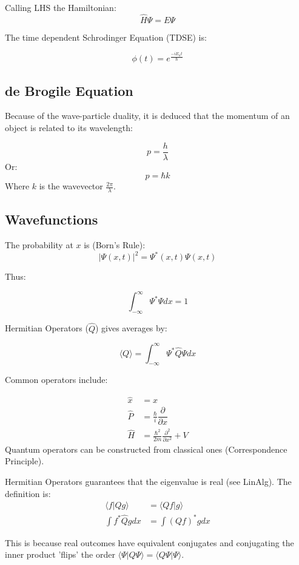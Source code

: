 \documentclass[12pt]{article}
\begin{document}
Calling LHS the Hamiltonian:
\[ \hat{H}\Psi = E\Psi\]

The time dependent Schrodinger Equation (TDSE) is:

\[\phi (t) = e^{\frac{-iE_n t}{\hbar}}\]

\subsection{de Brogile Equation}

Because of the wave-particle duality, it is deduced that the momentum of an object is related to its wavelength:

\[ p = \frac{h}{\lambda}\]
Or: 
\[ p = \hbar k\]
Where $k$ is the wavevector $\frac{2\pi}{\lambda}$.

\subsection{Wavefunctions}

The probability at $x$ is (Born's Rule):
\[|\Psi(x,t)|^2  = \Psi^*(x,t)\Psi(x,t)\]

Thus:

\[ \int_{-\infty}^{\infty}\Psi^*\Psi dx = 1\]

Hermitian Operators ($\hat{Q}$) gives averages by:

\[ \langle Q \rangle = \int_{-\infty}^{\infty}\Psi^* \hat{Q}\Psi dx\]

Common operators include:

\begin{align*}
    \hat{x} &= x \\
    \hat{P} &= \frac{\hbar}{i} \dfrac{\partial}{\partial x}\\
    \hat{H} &= \frac{\hbar^2}{2m}\frac{\partial^2}{\partial x^2} + V
\end{align*}
Quantum operators can be constructed from classical ones (Correspondence Principle).

Hermitian Operators guarantees that the eigenvalue is real (see LinAlg). The definition is:
\begin{align*}
    \langle f|Qg \rangle &= \langle Qf | g \rangle\\
    \int f^* \hat{Q}g dx &= \int (Qf)^* g dx
\end{align*}

This is because real outcomes have equivalent conjugates and conjugating the inner product 'flips' the order $\langle \Psi | Q\Psi \rangle = \langle Q\Psi | \Psi \rangle$.
\end{document}
